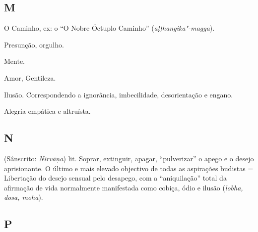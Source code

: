 \subsection{M}

\begin{glossarydescription}

\item[Magga] O Caminho, ex: o “O Nobre Óctuplo Caminho”
(\emph{aṭṭhangika"-magga}).

\item[Māna] Presunção, orgulho.

\item[Mano] Mente.

\item[Mettā] Amor, Gentileza.

\item[Moha] Ilusão. Correspondendo a ignorância, imbecilidade, desorientação e
engano.

\item[Muditā] Alegria empática e altruísta.

\end{glossarydescription}

\subsection{N}

\begin{glossarydescription}

\item[Nibbāna] (Sânscrito: \emph{Nirvāṇa}) lit. Soprar, extinguir, apagar,
“pulverizar” o apego e o desejo aprisionante. O último e mais elevado
objectivo de todas as aspirações budistas = Libertação do desejo sensual pelo
desapego, com a “aniquilação” total da afirmação de vida normalmente
manifestada como cobiça, ódio e ilusão (\emph{lobha, dosa, moha}).

\end{glossarydescription}

\subsection{P}

